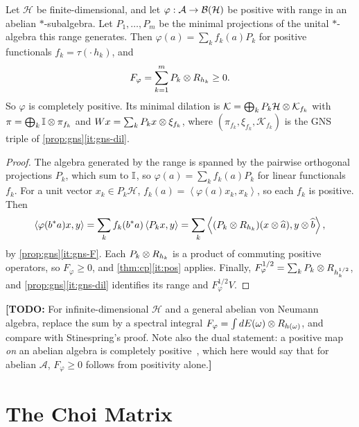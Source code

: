 \documentclass[12pt]{article}
\newcommand{\todo}[1]{\textcolor{\mysubcolor}{\small\textbf{[TODO:} #1\textbf{]}}}
\newcommand{\alg}{\mathcal{A}}             %
\newcommand{\hilb}{\mathcal{H}}            %
\newcommand{\dil}{\mathcal{K}}             %
\newcommand{\bdd}[1]{\mathcal{B}\br{#1}}   %
\newcommand{\ip}[2]{\left\langle #1 , #2 \right\rangle}
\newcommand{\vect}[1]{\widehat{#1}}
\newcommand{\Fphi}{F_{\varphi}}
\begin{document}
\begin{corollary}
\label{cor:abelian}
Let \(\hilb\) be finite-dimensional, and let \(\varphi : \alg \to \bdd\hilb\) be
positive with range in an abelian \(*\)-subalgebra. Let
\(P_1, \dots, P_m\) be the minimal projections of the unital \(*\)-algebra this
range generates. Then
\(\varphi(a) = \sum_k f_k(a)P_k\) for positive functionals
\(f_k = \tau(\cdot\,h_k)\), and
\[
  \Fphi = \sum_{k=1}^m P_k \tensor R_{h_k} \ge 0 .
\]
So \(\varphi\) is completely positive. Its minimal dilation is
\(\dil = \bigoplus_k P_k\hilb \tensor \dil_{f_k}\) with
\(\pi = \bigoplus_k {\mathbb I} \otimes \pi_{f_k}\) and
\(Wx = \sum_k P_kx \otimes \xi_{f_k}\), where \((\pi_{f_k}, \xi_{f_k}, \dil_{f_k})\)
is the GNS triple of \cref{prop:gns}\ref{it:gns-dil}.
\end{corollary}
\begin{proof}
The algebra generated by the range is spanned by the pairwise orthogonal
projections \(P_k\), which sum to \({\mathbb I}\), so \(\varphi(a) = \sum_k f_k(a)P_k\)
for linear functionals \(f_k\). For a unit vector \(x_k \in P_k\hilb\),
\(f_k(a) = \ip{\varphi(a)x_k}{x_k}\), so each \(f_k\) is positive. Then
\[
  \ip{\varphi(b^\adjoint a)x}{y}
  = \sum_k f_k(b^\adjoint a)\ip{P_kx}{y}
  = \sum_k \ip{(P_k \tensor R_{h_k})(x \tensor \vect a)}{y \tensor \vect b},
\]
by \cref{prop:gns}\ref{it:gns-F}. Each \(P_k \otimes R_{h_k}\) is a product of
commuting positive operators, so \(\Fphi \ge 0\), and \cref{thm:cp}\ref{it:pos}
applies. Finally,
\(\Fphi^{1/2} = \sum_k P_k \tensor R_{h_k^{1/2}}\), and
\cref{prop:gns}\ref{it:gns-dil} identifies its range and \(\Fphi^{1/2}V\).
\end{proof}
\todo{For infinite-dimensional \(\hilb\) and a general abelian von Neumann
algebra, replace the sum by a spectral integral
\(\Fphi = \int dE(\omega) \tensor R_{h(\omega)}\), and compare with Stinespring's
proof. Note also the dual statement: a positive map \emph{on} an abelian
algebra is completely positive~\cite{Stinespring1955}, which here would say
that for abelian \(\alg\), \(\Fphi \ge 0\) follows from positivity alone.}

\section{The Choi Matrix}
\label{sec:choi}
\end{document}
